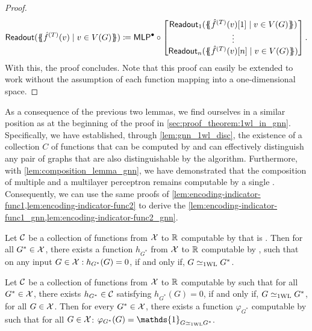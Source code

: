 \begin{proof}
    \begin{align*}
        \textsf{Readout}(\MSopen \hat{f}^{(T)}(v) \mid v \in V(G) \MSclose) \coloneqq \mlp^\bullet \circ \begin{bmatrix}
            \textsf{Readout}_1(\MSopen \hat{f}^{(T)}(v)[1] \mid v \in V(G) \MSclose)\\
            \vdots\\
            \textsf{Readout}_n(\MSopen \hat{f}^{(T)}(v)[n] \mid v \in V(G) \MSclose)
        \end{bmatrix}.
    \end{align*}
    With this, the proof concludes. Note that this proof can easily be extended to work without the assumption of each function mapping into a one-dimensional space.
\end{proof}

As a consequence of the previous two lemmas, we find ourselves in a similar position as at the beginning of the proof in \cref{sec:proof_theorem:1wl_in_gnn}. Specifically, we have established, through \cref{lem:gnn_1wl_disc}, the existence of a collection $C$ of functions that can be computed by \gnns and can effectively distinguish any pair of graphs that are also distinguishable by the \wl algorithm. Furthermore, with \cref{lem:composition_lemma_gnn}, we have demonstrated that the composition of multiple \gnns and a multilayer perceptron remains computable by a single \gnn. Consequently, we can use the same proofs of \cref{lem:encoding-indicator-func1,lem:encoding-indicator-func2} to derive the \cref{lem:encoding-indicator-func1_gnn,lem:encoding-indicator-func2_gnn}. 

\begin{corollary}\label{lem:encoding-indicator-func1_gnn}
    Let $\mathcal{C}$ be a collection of functions from $\mathcal{X}$ to $\mathbb{R}$ computable by \gnns that is \wldisc. Then for all $G^* \in \mathcal{X}$, there exists a function $h_{G^*}$ from $\mathcal{X}$ to $\mathbb{R}$ computable by \gnn, such that on any input $G \in \mathcal{X}: h_{G^*}(G) = 0$, if and only if, $G \simeq_{\text{1WL}} G^*$.
\end{corollary}
\begin{corollary}\label{lem:encoding-indicator-func2_gnn}
    Let $\mathcal{C}$ be a collection of functions from $\mathcal{X}$ to $\mathbb{R}$ computable by \gnns such that for all $G^* \in \mathcal{X}$, there exists $h_{G^*} \in \mathcal{C}$ satisfying $h_{G^*}(G) = 0 $, if and only if, $G \simeq_{\text{1WL}} G^*$, for all $G \in \mathcal{X}$. Then for every $G^* \in \mathcal{X}$, there exists a function $\varphi_{G^*} $ computable by \gnns such that for all $G \in \mathcal{X}$: $\varphi_{G^*}(G) = \mathds{1}_{G \wliso G^*}$.
\end{corollary}

